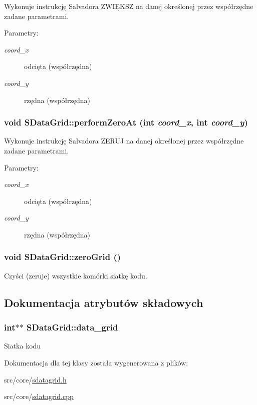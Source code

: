 Wykonuje instrukcję Salvadora ZWIĘKSZ na danej określonej przez współrzędne zadane parametrami. \begin{Desc}
\item[Parametry:]
\begin{description}
\item[{\em coord\_\-x}]odcięta (współrzędna) \item[{\em coord\_\-y}]rzędna (współrzędna) \end{description}
\end{Desc}
\hypertarget{classSDataGrid_bd825a6b1f64a7410c7c5f2a94af8fb9}{
\subsubsection[{performZeroAt}]{\setlength{\rightskip}{0pt plus 5cm}void SDataGrid::performZeroAt (int {\em coord\_\-x}, \/  int {\em coord\_\-y})}}
\label{classSDataGrid_bd825a6b1f64a7410c7c5f2a94af8fb9}


Wykonuje instrukcję Salvadora ZERUJ na danej określonej przez współrzędne zadane parametrami. \begin{Desc}
\item[Parametry:]
\begin{description}
\item[{\em coord\_\-x}]odcięta (współrzędna) \item[{\em coord\_\-y}]rzędna (współrzędna) \end{description}
\end{Desc}
\hypertarget{classSDataGrid_df36584ac2e2d38eda1bd06ad8fad355}{
\subsubsection[{zeroGrid}]{\setlength{\rightskip}{0pt plus 5cm}void SDataGrid::zeroGrid ()}}
\label{classSDataGrid_df36584ac2e2d38eda1bd06ad8fad355}


Czyści (zeruje) wszystkie komórki siatkę kodu. 

\subsection{Dokumentacja atrybutów składowych}
\hypertarget{classSDataGrid_6401d181afc8b06f75fcec860b02e9cb}{
\subsubsection[{data\_\-grid}]{\setlength{\rightskip}{0pt plus 5cm}int$\ast$$\ast$ {\bf SDataGrid::data\_\-grid}}}
\label{classSDataGrid_6401d181afc8b06f75fcec860b02e9cb}


Siatka kodu 

Dokumentacja dla tej klasy została wygenerowana z plików:\begin{CompactItemize}
\item 
src/core/\hyperlink{sdatagrid_8h}{sdatagrid.h}\item 
src/core/\hyperlink{sdatagrid_8cpp}{sdatagrid.cpp}\end{CompactItemize}
